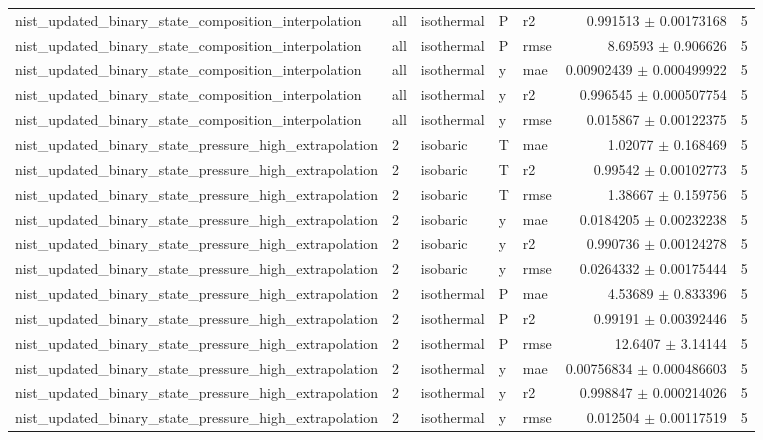 \begin{tabular}{lllllrr}
nist\_updated\_binary\_state\_composition\_interpolation & all & isothermal & P & r2 & 0.991513 $\pm$ 0.00173168 & 5 \\
nist\_updated\_binary\_state\_composition\_interpolation & all & isothermal & P & rmse & 8.69593 $\pm$ 0.906626 & 5 \\
nist\_updated\_binary\_state\_composition\_interpolation & all & isothermal & y & mae & 0.00902439 $\pm$ 0.000499922 & 5 \\
nist\_updated\_binary\_state\_composition\_interpolation & all & isothermal & y & r2 & 0.996545 $\pm$ 0.000507754 & 5 \\
nist\_updated\_binary\_state\_composition\_interpolation & all & isothermal & y & rmse & 0.015867 $\pm$ 0.00122375 & 5 \\
nist\_updated\_binary\_state\_pressure\_high\_extrapolation & 2 & isobaric & T & mae & 1.02077 $\pm$ 0.168469 & 5 \\
nist\_updated\_binary\_state\_pressure\_high\_extrapolation & 2 & isobaric & T & r2 & 0.99542 $\pm$ 0.00102773 & 5 \\
nist\_updated\_binary\_state\_pressure\_high\_extrapolation & 2 & isobaric & T & rmse & 1.38667 $\pm$ 0.159756 & 5 \\
nist\_updated\_binary\_state\_pressure\_high\_extrapolation & 2 & isobaric & y & mae & 0.0184205 $\pm$ 0.00232238 & 5 \\
nist\_updated\_binary\_state\_pressure\_high\_extrapolation & 2 & isobaric & y & r2 & 0.990736 $\pm$ 0.00124278 & 5 \\
nist\_updated\_binary\_state\_pressure\_high\_extrapolation & 2 & isobaric & y & rmse & 0.0264332 $\pm$ 0.00175444 & 5 \\
nist\_updated\_binary\_state\_pressure\_high\_extrapolation & 2 & isothermal & P & mae & 4.53689 $\pm$ 0.833396 & 5 \\
nist\_updated\_binary\_state\_pressure\_high\_extrapolation & 2 & isothermal & P & r2 & 0.99191 $\pm$ 0.00392446 & 5 \\
nist\_updated\_binary\_state\_pressure\_high\_extrapolation & 2 & isothermal & P & rmse & 12.6407 $\pm$ 3.14144 & 5 \\
nist\_updated\_binary\_state\_pressure\_high\_extrapolation & 2 & isothermal & y & mae & 0.00756834 $\pm$ 0.000486603 & 5 \\
nist\_updated\_binary\_state\_pressure\_high\_extrapolation & 2 & isothermal & y & r2 & 0.998847 $\pm$ 0.000214026 & 5 \\
nist\_updated\_binary\_state\_pressure\_high\_extrapolation & 2 & isothermal & y & rmse & 0.012504 $\pm$ 0.00117519 & 5 \\

\end{tabular}
